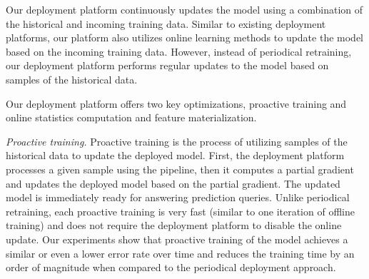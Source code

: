 

Our deployment platform continuously updates the model using a combination of the historical and incoming training data.
Similar to existing deployment platforms, our platform also utilizes online learning methods to update the model based on the incoming training data.
However, instead of periodical retraining, our deployment platform performs regular updates to the model based on samples of the historical data.

Our deployment platform offers two key optimizations, proactive training and online statistics computation and feature materialization. 

\textit{Proactive training.}
Proactive training is the process of utilizing samples of the historical data to update the deployed model.
First, the deployment platform processes a given sample using the pipeline, then it computes a partial gradient and updates the deployed model based on the partial gradient.
The updated model is immediately ready for answering prediction queries.
Unlike periodical retraining, each proactive training is very fast (similar to one iteration of offline training) and does not require the deployment platform to disable the online update.
Our experiments show that proactive training of the model achieves a similar or even a lower error rate over time and reduces the training time by an order of magnitude when compared to the periodical deployment approach.

